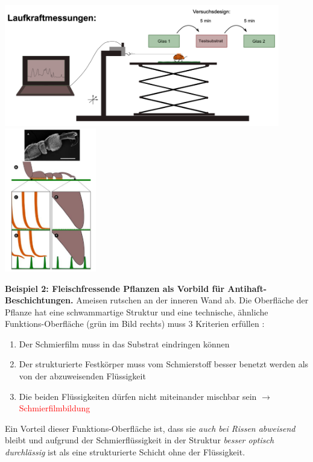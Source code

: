 \begin{center}
    \includegraphics[width=12cm]{lec4/figures/laufkraftmessung.png}
    \hfill
    \includegraphics[width=4cm]{lec4/figures/blatt_haftung.png}
\end{center}
\textbf{Beispiel 2: Fleischfressende Pflanzen als Vorbild für Antihaft-Beschichtungen.} Ameisen rutschen an der inneren Wand ab. Die Oberfläche der Pflanze hat eine schwammartige Struktur und eine technische, ähnliche Funktions-Oberfläche (grün im Bild rechts) muss 3 Kriterien erfüllen \dangersign:
\begin{enumerate}
    \item Der Schmierfilm muss in das Substrat eindringen können
    \item Der strukturierte Festkörper muss vom Schmierstoff besser benetzt werden als von der abzuweisenden Flüssigkeit
    \item Die beiden Flüssigkeiten dürfen nicht miteinander mischbar sein $\rightarrow$ \textcolor{red}{Schmierfilmbildung}
\end{enumerate}
Ein Vorteil dieser Funktions-Oberfläche ist, dass sie \textit{auch bei Rissen abweisend} bleibt und aufgrund der Schmierflüssigkeit in der Struktur \textit{besser optisch durchlässig} ist als eine strukturierte Schicht ohne der Flüssigkeit.


